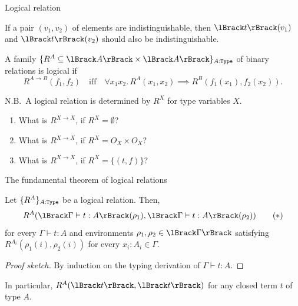 \begin{frame}{Logical relation}
  \begin{idea}
    If a pair $(v_1, v_2)$ of elements are indistinguishable, then $\Brackets{t}(v_1)$ and $\Brackets{t}(v_2)$ should also be indistinguishable.
  \end{idea}
  A family $\{R^A \subseteq \Brackets{A} \times \Brackets{A} \}_{A : \type}$ of binary relations is \alert{logical} if 
  \[
    R^{A \to B}(f_1, f_2) \quad\text{iff}\quad \forall x_1 x_2.\, R^{A}(x_1, x_2) \implies R^{B}(f_1(x_1), f_2(x_2)).
  \]

  N.B.\ A logical relation is determined by $R^X$ for type variables $X$.
  \begin{exercise*}
    \begin{enumerate}
      \item What is $R^{X \to X}$, if $R^X = \emptyset$?
      \item What is $R^{X \to X}$, if $R^X = O_X \times O_X$?
      \item What is $R^{X \to X}$, if $R^X = \{(t, f)\}$?
    \end{enumerate}
  \end{exercise*}
\end{frame}

\begin{frame}{The fundamental theorem of logical relations}
  \begin{theorem}\label{thm:fundamental_thm}
    Let $\{R^A\}_{A : \mathtt{Type}}$ be a logical relation.
    Then, 
    \begin{equation}\label{eq:fundamental_thm}
      R^A(\Brackets{\Gamma \vdash t : A}(\rho_1), \Brackets{\Gamma \vdash t : A}(\rho_2))
      \tag{$\ast$}
    \end{equation}
    for every $\Gamma \vdash t : A$ and environments $\rho_1, \rho_2 \in \Brackets{\Gamma}$ satisfying $R^{A_i}(\rho_1(i), \rho_2(i))$ for every $x_i : A_i \in \Gamma$.
  \end{theorem}
  \begin{proof}[Proof sketch]
    By induction on the typing derivation of $\Gamma \vdash t : A$.
%
  \end{proof}
  In particular, $R^A(\Brackets{t}, \Brackets{t})$ for any closed term $t$ of type $A$. 
\end{frame}

